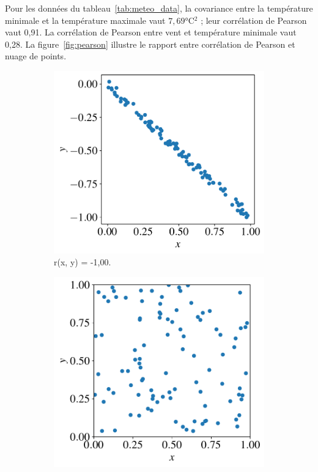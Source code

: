 \begin{exemple}
  Pour les données du tableau~\ref{tab:meteo_data}, la covariance entre la
  température minimale et la température maximale vaut $7,69 \si{\celsius^2}$ ;
  leur corrélation de Pearson vaut 0,91. La corrélation de Pearson entre vent
  et température minimale vaut 0,28. La figure~\ref{fig:pearson} illustre le
  rapport entre corrélation de Pearson et nuage de points.
\end{exemple}
\begin{figure}[h]
  \centering
    \begin{subfigure}[t]{0.24\textwidth}
      \centering
      \includegraphics[width=\textwidth]{figures/stats/pearson_3}
      \caption{r(x, y) = -1,00.}
    \end{subfigure} \hfill
    \begin{subfigure}[t]{0.24\textwidth}
      \centering
      \includegraphics[width=\textwidth]{figures/stats/pearson_0}

\end{subfigure}
\end{figure}
